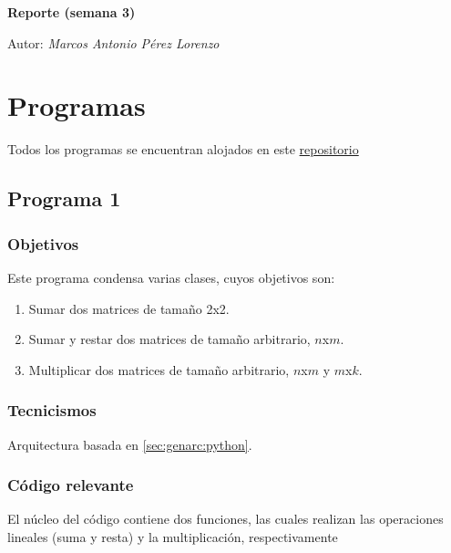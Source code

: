 \documentclass{article}[12pt,a4paper]
\begin{document}
\begin{titlepage}

  \centering
  {\huge\bfseries Reporte (semana 3)\par}
	{\Large Autor: \itshape Marcos Antonio Pérez Lorenzo\par}
\end{titlepage}

\pagebreak



\section{Programas}

Todos los programas se encuentran alojados en este \href{https://github.com/MarcosHCK/master-programming/}{repositorio \faGithubSquare}

\subsection{Programa 1}

\subsubsection{Objetivos}

Este programa condensa varias clases, cuyos objetivos son:

\begin{enumerate}
  \item Sumar dos matrices de tamaño 2x2.
  \item Sumar y restar dos matrices de tamaño arbitrario, \(n\)x\(m\).
  \item Multiplicar dos matrices de tamaño arbitrario, \(n\)x\(m\) y \(m\)x\(k\).
\end{enumerate}

\subsubsection{Tecnicismos}

Arquitectura basada en \ref{sec:genarc:python}.

\subsubsection{Código relevante}

El núcleo del código contiene dos funciones, las cuales realizan las operaciones lineales (suma y resta) y la multiplicación, respectivamente
\end{document}
